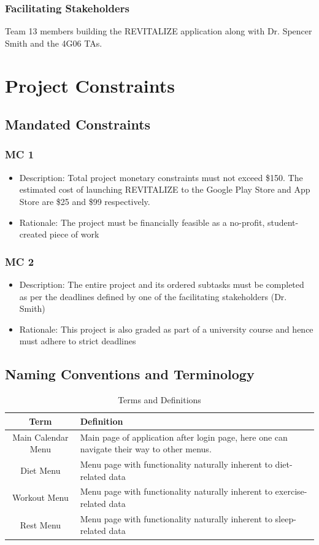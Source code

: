 \documentclass[12pt,letterpaper]{article}
\begin{document}
\subsubsection{Facilitating Stakeholders}
Team 13 members building the REVITALIZE application along with Dr. Spencer Smith and the 4G06 TAs.

\section{Project Constraints}
\subsection{Mandated Constraints}
\subsubsection{MC 1}
\begin{itemize}
	\item Description: Total project monetary constraints must not exceed \$150. The estimated cost of launching REVITALIZE to the Google Play Store and App Store are \$25 and \$99 respectively.
	\item Rationale: The project must be financially feasible as a no-profit, student-created piece of work
\end{itemize}

\subsubsection{MC 2}
\begin{itemize}
	\item Description: The entire project and its ordered subtasks must be completed as per the deadlines defined by one of the facilitating stakeholders (Dr. Smith)
	\item Rationale: This project is also graded as part of a university course and hence must adhere to strict deadlines
\end{itemize}

\subsection{Naming Conventions and Terminology}
\label{sub:Naming Conventions and Terminology}
\begin{table}[H]
	\caption{Terms and Definitions}
	\centering
	\begin{tabular}{|c|p{10cm}|}
		\hline
		\textbf{Term} & \textbf{Definition}\\
		\hline
		Main Calendar Menu & Main page of application after login page, here one can navigate their way to other menus.\\
		\hline
		Diet Menu & Menu page with functionality naturally inherent to diet-related data\\
		\hline
		Workout Menu & Menu page with functionality naturally inherent to exercise-related data\\
		\hline
		Rest Menu &Menu page with functionality naturally inherent to sleep-related data\\
		\hline
	\end{tabular}
\end{table}
\end{document}
